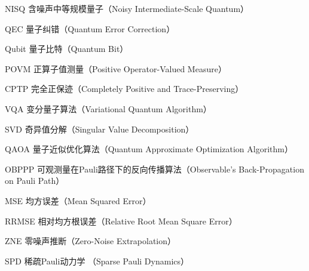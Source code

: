 
\begin{denotation}[3cm]
  \item[NISQ] 含噪声中等规模量子（Noisy Intermediate-Scale Quantum）
  \item[QEC] 量子纠错（Quantum Error Correction）
  \item[Qubit] 量子比特（Quantum Bit）
  \item[POVM] 正算子值测量（Positive Operator-Valued Measure）
  \item[CPTP] 完全正保迹（Completely Positive and Trace-Preserving） 
  \item[VQA] 变分量子算法（Variational Quantum Algorithm）
  \item[SVD] 奇异值分解（Singular Value Decomposition）
  \item[QAOA] 量子近似优化算法（Quantum Approximate Optimization Algorithm）
  \item[OBPPP] 可观测量在Pauli路径下的反向传播算法（Observable's Back-Propagation on Pauli Path）
  \item[MSE] 均方误差（Mean Squared Error） 
  \item[RRMSE] 相对均方根误差（Relative Root Mean Square Error） 
  \item[ZNE] 零噪声推断（Zero-Noise Extrapolation）
  \item[SPD] 稀疏Pauli动力学 （Sparse Pauli Dynamics）
\end{denotation}





